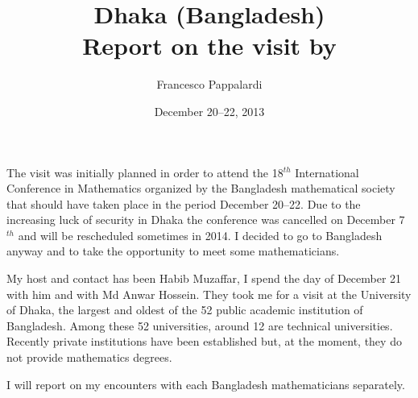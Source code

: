 \documentclass[12pt]{article}
\title{Dhaka (Bangladesh)\\ Report on the visit by}
\author{Francesco Pappalardi}
\date{December 20--22, 2013}
\begin{document}
\maketitle

The visit was initially planned in order to attend the 18$^{th}$ International Conference in Mathematics organized by the Bangladesh mathematical society that should have taken place in the period December 20--22. Due to the increasing 
luck of security in Dhaka the conference was cancelled on December 7$^{th}$ and will
be rescheduled sometimes in 2014. I decided to go to Bangladesh anyway and to take the
opportunity to meet some mathematicians.

My host and contact has been Habib Muzaffar,
I spend the day of December 21 with him and with Md Anwar Hossein. They took me
for a visit at the University of Dhaka, the largest and oldest of the 52 public academic institution of Bangladesh. Among these 52 universities, around 12 are technical universities. Recently private institutions have been established but, at the moment, they do not provide mathematics degrees.

I will report on my encounters with each Bangladesh mathematicians separately.
\end{document}
